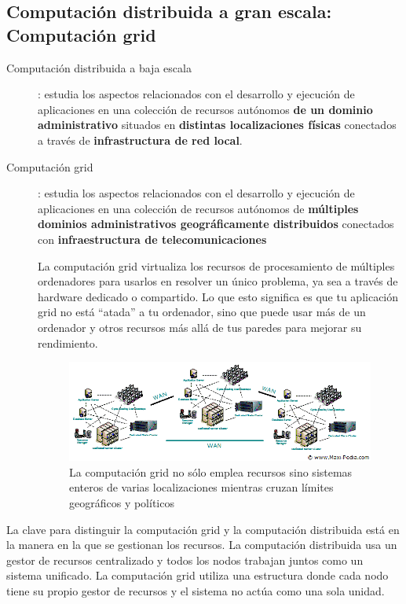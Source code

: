 \documentclass[10pt,a4paper,spanish]{report}
\begin{document}
\textcolor[rgb]{0.2,0.4,0.8}{\subsection{Computación distribuida a gran escala: Computación grid}}
\begin{description}
  \item[Computación distribuida a baja escala]: estudia los aspectos relacionados con el desarrollo y ejecución de aplicaciones en una colección de recursos autónomos \textbf{\textcolor[rgb]{0.2,0.4,0.8}{de un dominio administrativo}} situados en \textbf{\textcolor[rgb]{0.2,0.4,0.8}{distintas localizaciones físicas}} conectados a través de \textbf{\textcolor[rgb]{0.2,0.4,0.8}{infrastructura de red local}}.
  \item[Computación grid]: estudia los aspectos relacionados con el desarrollo y ejecución de aplicaciones en una colección de recursos autónomos de \textbf{\textcolor[rgb]{0.2,0.4,0.8}{múltiples dominios administrativos geográficamente distribuidos}} conectados con \textbf{\textcolor[rgb]{0.2,0.4,0.8}{infraestructura de telecomunicaciones}}

La computación grid virtualiza los recursos de procesamiento de múltiples ordenadores para usarlos en resolver un único problema, ya sea a través de hardware dedicado o compartido. Lo que esto significa es que tu aplicación grid no está ``atada'' a tu ordenador, sino que puede usar más de un ordenador y otros recursos más allá de tus paredes para mejorar su rendimiento.


\begin{figure}[!h]
\centering
\includegraphics[width=1\textwidth]{8}
\caption{La computación grid no sólo emplea recursos sino sistemas enteros de varias localizaciones mientras cruzan límites geográficos y políticos}
\label{grid_computing}
\end{figure}


\end{description}

La clave para distinguir la computación grid y la computación distribuida está en la manera en la que se gestionan los recursos. La computación distribuida usa un gestor de recursos centralizado y todos los nodos trabajan juntos como un sistema unificado. La computación grid utiliza una estructura donde cada nodo tiene su propio gestor de recursos y el sistema no actúa como una sola unidad.
\end{document}
